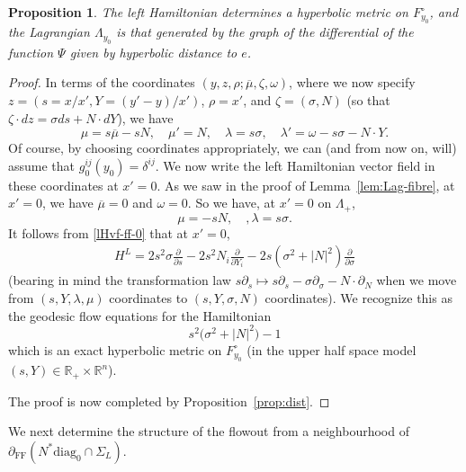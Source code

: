 \documentclass[10pt, a4paper, twoside]{amsart}
\numberwithin{equation}{section}
\newtheorem{proposition}[theorem]{Proposition}
\theoremstyle{remark}
\begin{document}
\begin{proposition}\label{prop:LambdaFF}
The left Hamiltonian determines a hyperbolic metric on $F_{y_0}^\circ$, and the Lagrangian $\Lambda_{y_0}$ is that generated by the graph of the differential of the function $\Psi$ given by hyperbolic distance to $e$. 
\end{proposition}

\begin{proof}
In terms of the coordinates $(y, z, \rho; \overline{\mu}, \zeta, \omega)$, where we now specify $z = (s = x/x', Y = (y'-y)/x')$, $\rho = x'$, and $\zeta = (\sigma, N)$ (so that $\zeta \cdot dz = \sigma ds + N \cdot dY$), we have 
$$
\mu = s\overline{\mu} - s N, \quad \mu' = N, \quad \lambda = s \sigma, \quad \lambda' = \omega - s \sigma - N \cdot Y. 
$$
Of course, by choosing coordinates appropriately, we can (and from now on, will) assume that $g_0^{ij}(y_0) = \delta^{ij}$. 
We now write the left  Hamiltonian vector field in these coordinates at $x' = 0$. As we saw in the proof of Lemma~\ref{lem:Lag-fibre}, at $x' = 0$, we have $\overline{\mu} = 0$ and $\omega = 0$. So we have, at $x' = 0$ on $\Lambda_+$, 
\begin{equation}
\mu = -sN, \quad, \lambda = s \sigma.
\label{mul}\end{equation}
It follows from \eqref{lHvf-ff-0} that at $x' = 0$, 
\begin{equation}\begin{gathered}
H^L = 2  s^2 \sigma \frac{\partial}{\partial s} - 2s^2 N_i\frac{\partial}{\partial Y_i} 
- 2s (\sigma^2 + |N|^2) \frac{\partial}{\partial \sigma} 
\end{gathered}\label{lHvf-ff-0-2}\end{equation}
(bearing in mind the transformation law $s \partial_s \mapsto s \partial_s - \sigma \partial_\sigma - N \cdot \partial_N$ when we move from $(s, Y, \lambda, \mu)$ coordinates to $(s, Y, \sigma, N)$ coordinates). We recognize this as the geodesic flow equations for the Hamiltonian 
\begin{equation}
s^2 \big( \sigma^2 + |N|^2 \big) - 1
\label{hyp-metric}\end{equation}
which is an exact hyperbolic metric on $F_{y_0}^\circ$ (in the upper half space model $(s, Y) \in {\mathbb{R}}_+ \times {\mathbb{R}}^n$). 

The proof is now completed by Proposition~\ref{prop:dist}. 
\end{proof}

We next determine the structure of the flowout from a neighbourhood of $\partial_{\mathrm{FF}}(N^* {\mathrm{diag}_0} \cap \Sigma_L)$.
\end{document}

